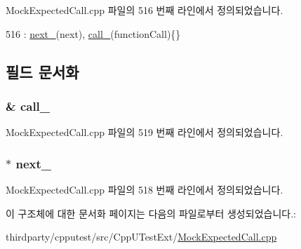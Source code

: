 Mock\+Expected\+Call.\+cpp 파일의 516 번째 라인에서 정의되었습니다.


\begin{DoxyCode}
516 : \hyperlink{struct_mock_expected_call_composite_node_a5d050d50fcce527d2f9ce61235af2097}{next\_}(next), \hyperlink{struct_mock_expected_call_composite_node_a4e0079c04d0b0b8aa23d409ef251b0d2}{call\_}(functionCall)\{\}
\end{DoxyCode}


\subsection{필드 문서화}
\subsubsection[{\texorpdfstring{call\+\_\+}{call_}}]{\& call\+\_\+}\hypertarget{struct_mock_expected_call_composite_node_a4e0079c04d0b0b8aa23d409ef251b0d2}{}\label{struct_mock_expected_call_composite_node_a4e0079c04d0b0b8aa23d409ef251b0d2}


Mock\+Expected\+Call.\+cpp 파일의 519 번째 라인에서 정의되었습니다.

\subsubsection[{\texorpdfstring{next\+\_\+}{next_}}]{$\ast$ next\+\_\+}\hypertarget{struct_mock_expected_call_composite_node_a5d050d50fcce527d2f9ce61235af2097}{}\label{struct_mock_expected_call_composite_node_a5d050d50fcce527d2f9ce61235af2097}


Mock\+Expected\+Call.\+cpp 파일의 518 번째 라인에서 정의되었습니다.



이 구조체에 대한 문서화 페이지는 다음의 파일로부터 생성되었습니다.\+:\begin{DoxyCompactItemize}
\item 
thirdparty/cpputest/src/\+Cpp\+U\+Test\+Ext/\hyperlink{_mock_expected_call_8cpp}{Mock\+Expected\+Call.\+cpp}\end{DoxyCompactItemize}
